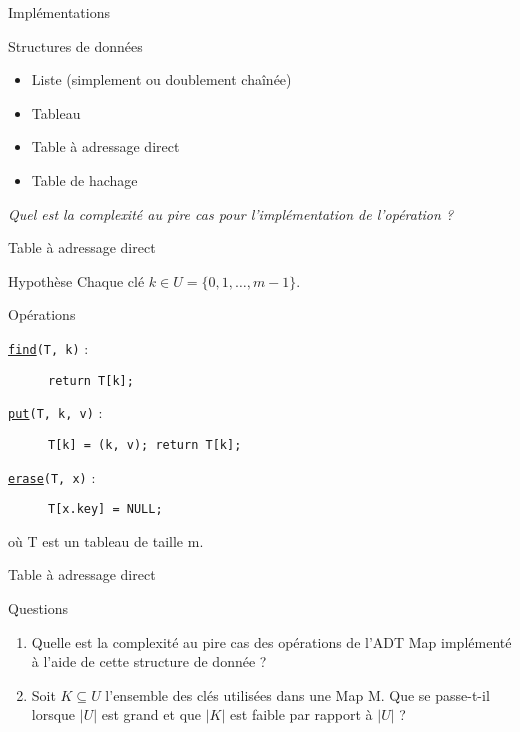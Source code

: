 \documentclass[handout]{beamer}
\let\emph\relax %
\newcommand{\Op}[2]{\texttt{\underline{#1}#2}}
\begin{document}
\begin{frame}{Implémentations}
    \begin{block}{Structures de données}
        \begin{itemize}
            \item Liste (simplement ou doublement chaînée)
            \item Tableau
            \item Table à adressage direct
            \item Table de hachage
        \end{itemize}
    \end{block}
    \pause
    \textit{Quel est la complexité au pire cas pour l'implémentation de l'opération \emph{find} ?}
\end{frame}

\begin{frame}[t]{Table à adressage direct}
    \begin{block}{Hypothèse}
        Chaque clé $k \in U = \{0, 1,\ldots, m-1\}$.
    \end{block}
    \pause
    \begin{block}{Opérations}
        \begin{description}
            \item[\Op{find}{(T, k)} :] \texttt{return T[k];}
            \item[\Op{put}{(T, k, v)} :] \texttt{T[k] = (k, v); return T[k];}
            \item[\Op{erase}{(T, x)} :] \texttt{T[x.key] = NULL;}
        \end{description}
        où T est un tableau de taille m.
    \end{block}
\end{frame}

\begin{frame}[t]{Table à adressage direct}
    \begin{block}{Questions}
        \begin{enumerate}
            \item Quelle est la complexité au pire cas des opérations de l'ADT
                Map implémenté à l'aide de cette structure de donnée ?
            \pause
            \item Soit $K \subseteq U$ l'ensemble des clés utilisées dans une Map M. Que se
                passe-t-il lorsque $|U|$ est grand et que $|K|$ est faible par rapport à $|U|$ ?
        \end{enumerate}
    \end{block}
\end{frame}
\end{document}
